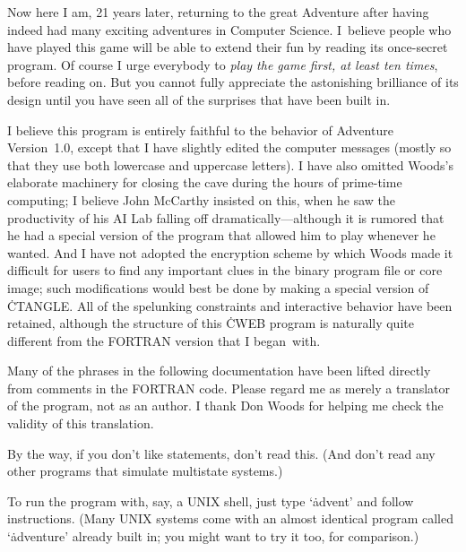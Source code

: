 Now here I am, 21 years later, returning to the great Adventure after
having indeed had many exciting adventures in Computer Science. I~believe
people who have played this game will be able to extend their fun by
reading its once-secret program. Of course I urge everybody to {\it play the
game first, at least ten times}, before reading on. But you cannot
fully appreciate the astonishing brilliance of its design until
you have seen all of the surprises that have been built in.

I believe this program is entirely faithful to the behavior of Adventure
Version~1.0, except that I have slightly edited the computer messages
(mostly so that they use both lowercase and uppercase letters). I have also
omitted Woods's elaborate machinery for closing the cave during the hours
of prime-time computing; I believe John McCarthy insisted on this, when
he saw the productivity of his AI Lab falling off dramatically---although
it is rumored that he had a special version of the program that
allowed him to play whenever he wanted. And I have
not adopted the encryption scheme by which Woods made it difficult for
users to find any important clues in
the binary program file or core image; such
modifications would best be done by making a special version of \.{CTANGLE}.
All of the spelunking constraints and interactive behavior have
been retained, although the structure of this \.{CWEB} program is
naturally quite different from the {\mc FORTRAN} version that I began~with.

Many of the phrases in the following documentation have been lifted directly
from comments in the {\mc FORTRAN} code. Please regard me as merely
a translator of the program, not as an author. I thank Don Woods for
helping me check the validity of this translation.

By the way, if you don't like  statements, don't read this. (And
don't
read any other programs that simulate multistate systems.)

\smallskip{}

\Y\B{}\par
\fi

To run the program with, say, a {\mc UNIX} shell, just type `\.{advent}'
and follow instructions. (Many {\mc UNIX} systems come with an
almost identical program called `\.{adventure}' already built in;
you might want to try it too, for comparison.)


